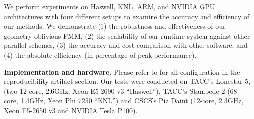 We perform  experiments on Haswell, KNL, ARM, and NVIDIA GPU architectures
with four different setups to examine the accuracy and efficiency of
our methods. We demonstrate 
(1) the robustness and effectiveness of our geometry-oblivious FMM,
(2) the scalability of our runtime system against other parallel schemes, 
(3) the accuracy and cost comparison with other software, and 
(4) the absolute efficiency (in percentage of peak performance).

\textbf{Implementation and hardware.} Please refer to  
for all configuration in the reproducibility artifact section. Our
tests were conducted on TACC's Lonestar 5, (two 12-core, 2.6GHz, Xeon
E5-2690 v3 ``Haswell''), TACC's Stampede 2 (68-core, 1.4GHz, Xeon Phi
7250 ``KNL'') and CSCS's Piz Daint (12-core, 2.3GHz, Xeon E5-2650 v3
and NVIDIA Tesla P100). 

%

